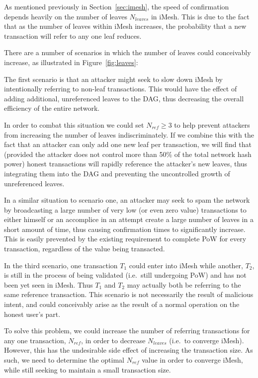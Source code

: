 \documentclass[a4paper,10pt,twocolumn]{article}
\begin{document}
As mentioned previously in Section~\ref{sec:imesh}, the speed of confirmation
depends heavily on the number of leaves \( N_{leaves} \) in iMesh. This is due to the fact that as the number of leaves within iMesh increases,
the probability that a new transaction will refer to any one leaf reduces. 

There are a number of scenarios in which the number of leaves could conceivably increase, as illustrated in Figure~\ref{fig:leaves}:

The first scenario is that an attacker might seek to slow down iMesh by intentionally referring to non-leaf transactions.
This would have the effect of adding additional, unreferenced leaves to the DAG, thus decreasing the overall efficiency of the entire network.

In order to combat this situation we could set \( N_{ref} \geq 3 \) to help prevent attackers from increasing the number of leaves indiscriminately.
If we combine this with the fact that an attacker can only add one new leaf per transaction, we will find that (provided the attacker does not control more than 50\% of the total network hash power) honest transactions will rapidly 
reference the attacker's new leaves, thus integrating them into the DAG and preventing the uncontrolled growth of unreferenced leaves.

In a similar situation to scenario one, an attacker may seek to spam the network by broadcasting a large number of very low (or even zero value) transactions to either himself or an accomplice in an attempt create a large number of leaves in a short 
amount of time, thus causing confirmation times to significantly increase. This is easily prevented by the existing requirement to complete PoW for every transaction, regardless of the value being transacted.

In the third scenario, one transaction \(T_1\) could enter into iMesh while another, \(T_2\), is still in the process of being validated (i.e.\ still undergoing PoW) and has not been yet seen in iMesh.
Thus \(T_1\) and \(T_2\) may actually both be referring to the same reference transaction.
This scenario is not necessarily the result of malicious intent, and could conceivably arise as the result of a normal operation on the honest user's part.

To solve this problem, we could increase the number of referring transactions for any one transaction, \( N_{ref} \), in order 
to decrease \( N _{leaves} \) (i.e.\ to converge iMesh). However, this has the undesirable side effect of increasing the transaction size.
As such, we need to determine the optimal \( N_{ref} \) value in order to converge iMesh, while still seeking to maintain a small transaction size. 
\end{document}
